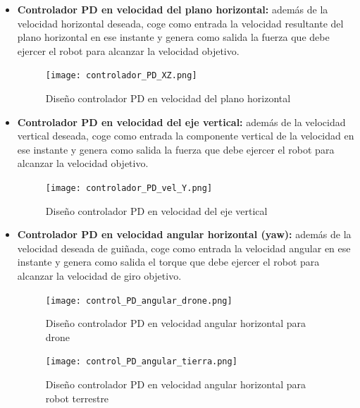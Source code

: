 \begin{itemize}
    \item \textbf{Controlador PD en velocidad del plano horizontal:} además de la velocidad horizontal deseada, coge como entrada la velocidad resultante del plano horizontal en ese instante y genera como salida la fuerza que debe ejercer el robot para alcanzar la velocidad objetivo. 
    
    \begin{figure}[h!]
    \centering
    \texttt{[image: controlador\_PD\_XZ.png]}
    \caption[Diseño controlador PD en velocidad del plano horizontal]{Diseño controlador PD en velocidad del plano horizontal\footnotemark}
    \label{fig:esquema_pd_1}
    \end{figure}
    
    \item \textbf{Controlador PD en velocidad del eje vertical:} además de la velocidad vertical deseada, coge como entrada la componente vertical de la velocidad en ese instante y genera como salida la fuerza que debe ejercer el robot para alcanzar la velocidad objetivo. 
    
    \begin{figure}[h!]
    \centering
    \texttt{[image: controlador\_PD\_vel\_Y.png]}
\caption[Diseño controlador PD en velocidad del eje vertical]{Diseño controlador PD en velocidad del eje vertical\footnotemark}
    \label{fig:esquema_pd_2}
    \end{figure}
    
    \item \textbf{Controlador PD en velocidad angular horizontal (yaw):} además de la velocidad deseada de guiñada, coge como entrada la velocidad angular en ese instante y genera como salida el torque que debe ejercer el robot para alcanzar la velocidad de giro objetivo. 
    
    \clearpage
    \begin{figure}[h!]
    \centering
    \texttt{[image: control\_PD\_angular\_drone.png]}
\caption[Diseño controlador PD en velocidad angular horizontal para drone]{Diseño controlador PD en velocidad angular horizontal para drone\footnotemark}
    \label{fig:esquema_pd_3}
    \end{figure}

    \begin{figure}[h!]
    \centering
    \texttt{[image: control\_PD\_angular\_tierra.png]}
\caption[Diseño controlador PD en velocidad angular horizontal para robot terrestre]{Diseño controlador PD en velocidad angular horizontal para robot terrestre\footnotemark}
    \label{fig:esquema_pd_4}
    \end{figure} 
    

\end{itemize}
